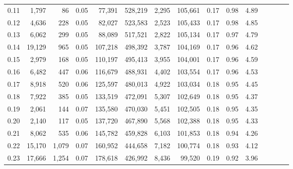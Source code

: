 \begin{tabular}{rrrcrrrrrrrrrrr}
0.11 &   1,797 &     86 &                                       0.05 &   77,391 &  528,219 &    2,295 &  105,661 &  0.17 &  0.98 &                         4.89 \\
0.12 &   4,636 &    228 &                                       0.05 &   82,027 &  523,583 &    2,523 &  105,433 &  0.17 &  0.98 &                         4.85 \\
0.13 &   6,062 &    299 &                                       0.05 &   88,089 &  517,521 &    2,822 &  105,134 &  0.17 &  0.97 &                         4.79 \\
0.14 &  19,129 &    965 &                                       0.05 &  107,218 &  498,392 &    3,787 &  104,169 &  0.17 &  0.96 &                         4.62 \\
0.15 &   2,979 &    168 &                                       0.05 &  110,197 &  495,413 &    3,955 &  104,001 &  0.17 &  0.96 &                         4.59 \\
0.16 &   6,482 &    447 &                                       0.06 &  116,679 &  488,931 &    4,402 &  103,554 &  0.17 &  0.96 &                         4.53 \\
0.17 &   8,918 &    520 &                                       0.06 &  125,597 &  480,013 &    4,922 &  103,034 &  0.18 &  0.95 &                         4.45 \\
0.18 &   7,922 &    385 &                                       0.05 &  133,519 &  472,091 &    5,307 &  102,649 &  0.18 &  0.95 &                         4.37 \\
0.19 &   2,061 &    144 &                                       0.07 &  135,580 &  470,030 &    5,451 &  102,505 &  0.18 &  0.95 &                         4.35 \\
0.20 &   2,140 &    117 &                                       0.05 &  137,720 &  467,890 &    5,568 &  102,388 &  0.18 &  0.95 &                         4.33 \\
0.21 &   8,062 &    535 &                                       0.06 &  145,782 &  459,828 &    6,103 &  101,853 &  0.18 &  0.94 &                         4.26 \\
0.22 &  15,170 &  1,079 &                                       0.07 &  160,952 &  444,658 &    7,182 &  100,774 &  0.18 &  0.93 &                         4.12 \\
0.23 &  17,666 &  1,254 &                                       0.07 &  178,618 &  426,992 &    8,436 &   99,520 &  0.19 &  0.92 &                         3.96 \\

\end{tabular}
